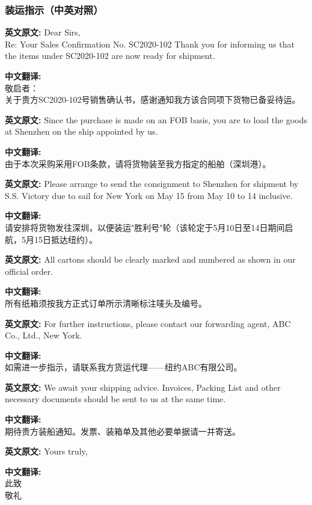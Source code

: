 \documentclass{ctexbeamer}
\begin{document}
\begin{frame}[allowframebreaks]
\frametitle{装运指示（中英对照）}
\textbf{英文原文:}
Dear Sirs,\\
Re: Your Sales Confirmation No. SC2020-102 Thank you for informing us that the items under SC2020-102 are now ready for shipment.

\smallskip
\textbf{中文翻译:}\\
敬启者：\\
关于贵方SC2020-102号销售确认书，感谢通知我方该合同项下货物已备妥待运。

\medskip
\textbf{英文原文:}
Since the purchase is made on an FOB basis, you are to load the goods at Shenzhen on the ship appointed by us.

\smallskip
\textbf{中文翻译:}\\
由于本次采购采用FOB条款，请将货物装至我方指定的船舶（深圳港）。

\medskip
\textbf{英文原文:}
Please arrange to send the consignment to Shenzhen for shipment by S.S. Victory due to sail for New York on May 15 from May 10 to 14 inclusive.

\smallskip
\textbf{中文翻译:}\\
请安排将货物发往深圳，以便装运"胜利号"轮（该轮定于5月10日至14日期间启航，5月15日抵达纽约）。

\framebreak

\textbf{英文原文:}
All cartons should be clearly marked and numbered as shown in our official order.

\smallskip
\textbf{中文翻译:}\\
所有纸箱须按我方正式订单所示清晰标注唛头及编号。

\medskip
\textbf{英文原文:}
For further instructions, please contact our forwarding agent, ABC Co., Ltd., New York.

\smallskip
\textbf{中文翻译:}\\
如需进一步指示，请联系我方货运代理——纽约ABC有限公司。

\medskip
\textbf{英文原文:}
We await your shipping advice. Invoices, Packing List and other necessary documents should be sent to us at the same time.

\smallskip
\textbf{中文翻译:}\\
期待贵方装船通知。发票、装箱单及其他必要单据请一并寄送。

\medskip
\textbf{英文原文:}
Yours truly,

\smallskip
\textbf{中文翻译:}\\
此致\\
敬礼
\end{frame}
\end{document}
